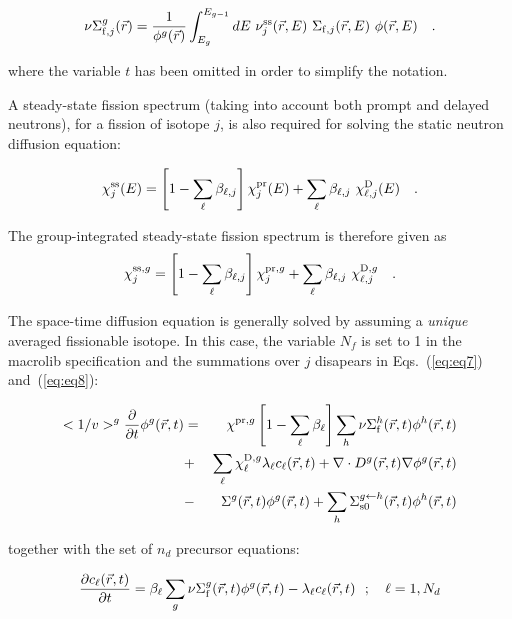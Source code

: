 \begin{equation}
\nu\Sigma_{{\rm f},j}^g(\vec r)={1 \over \phi^g(\vec r)} \int_{E_g}^{E_{g-1}} dE \ \nu_j^{\rm ss}(\vec r,E) \ \Sigma_{{\rm f},j}(\vec r,E) \ \phi(\vec r,E) \ \ \ .
\end{equation}

\noindent where the variable $t$ has been omitted in order to simplify
the notation.

\vskip 0.2cm

A steady-state fission spectrum (taking into account both prompt and delayed neutrons), for a fission of isotope $j$, is also required for solving the static neutron diffusion equation:

\begin{equation}
\chi_j^{\rm ss}(E)=\left[1-\sum_\ell\beta_{\ell,j}\right] \chi_j^{\rm pr}(E)+\sum_\ell \beta_{\ell,j} \ \chi_{\ell,j}^{\rm D}(E) \ \ \ .
\end{equation}

\vskip 0.2cm

The group-integrated steady-state fission spectrum is therefore given as
\begin{equation}
\chi_j^{{\rm ss},g} = \left[1-\sum_\ell\beta_{\ell,j}\right] \chi_j^{{\rm pr},g}+\sum_\ell \beta_{\ell,j} \ \chi_{\ell,j}^{{\rm D},g} \ \ \ .
\end{equation}

\vskip 0.2cm

The space-time diffusion equation is generally solved by assuming a {\sl unique} averaged fissionable isotope.
In this case, the variable $N_f$ is set to 1 in the {\sc macrolib} specification
and the summations over $j$ disapears in Eqs.~(\ref{eq:eq7}) and~(\ref{eq:eq8}):

\begin{eqnarray}
\nonumber <1/v>^g {\partial\over \partial t}\phi^g(\vec r,t) &=& \chi^{{\rm pr},g}
\left[1-\sum_\ell\beta_\ell\right]\sum_h \nu\Sigma_{\rm f}^h(\vec r,t) \phi^h(\vec r,t)\\
\nonumber &+&\sum_\ell\chi_\ell^{{\rm D},g}\lambda_\ell c_\ell(\vec r,t) + \nabla \cdot D^g(\vec r,t)
\nabla\phi^g(\vec r,t)\\
&-& \Sigma^g(\vec r,t) \phi^g(\vec r,t) +
\sum_h \Sigma_{\rm s0}^{g \leftarrow h}(\vec r,t)
\phi^h(\vec r,t)
\label{eq:eq9}
\end{eqnarray}

\noindent together with the set of $n_d$ precursor equations:

\begin{equation}
{\partial c_\ell(\vec r,t) \over \partial t}=\beta_\ell \sum_g
\nu\Sigma_{\rm f}^g(\vec r,t) \phi^g(\vec r,t)-\lambda_\ell c_\ell(\vec r,t) \ \ ; \ \ \
\ell=1,N_d
\label{eq:eq10}
\end{equation}

